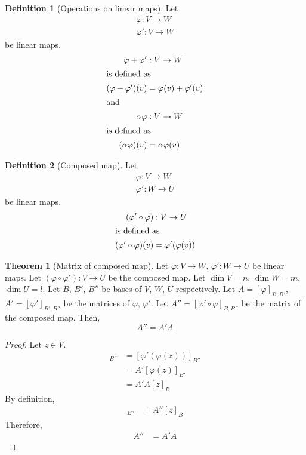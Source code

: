 \documentclass[fleqn, a4paper, 12pt, draft]{article}
\theoremstyle{definition}
\newtheorem{definition}{Definition} %
\theoremstyle{theorem}
\newtheorem{theorem}{Theorem} %
\theoremstyle{remark}
\numberwithin{corollary}{theorem}
\numberwithin{equation}{theorem}
\begin{document}
\begin{definition}[Operations on linear maps]
	Let
	\begin{align*}
		\varphi : V \to W\\
		\varphi' : V \to W
	\end{align*}
	be linear maps.
	\begin{align*}
		\varphi + \varphi' &: V \to W\\
		\intertext{is defined as}
		(\varphi + \varphi')(v) &= \varphi(v) + \varphi'(v)\\
		\intertext{and}
		\alpha \varphi &: V \to W\\
		\intertext{is defined as}
		(\alpha \varphi)(v) &= \alpha \varphi(v)
	\end{align*}
\end{definition}

\begin{definition}[Composed map]
	Let
	\begin{align*}
		\varphi : V \to W\\
		\varphi' : W \to U
	\end{align*}
	be linear maps.
	\begin{align*}
	(\varphi' \circ \varphi) &: V \to U\\
	\intertext{is defined as}
	(\varphi' \circ \varphi)(v) &= \varphi'(\varphi(v))
	\end{align*}
\end{definition}

\begin{theorem}[Matrix of composed map]
	Let $\varphi : V \to W$, $\varphi' : W \to U$ be linear maps. Let $(\varphi \circ \varphi') : V \to U$ be the composed map. Let $\dim V = n$, $\dim W = m$, $\dim U = l$. Let $B$, $B'$, $B''$ be bases of $V$, $W$, $U$ respectively. Let $A = [\varphi]_{B, B'}$, $A' = [\varphi']_{B', B''}$ be the matrices of $\varphi$, $\varphi'$. Let $A'' = [\varphi' \circ \varphi]_{B, B''}$ be the matrix of the composed map. Then, 
	\begin{equation*}
		A'' = A' A
	\end{equation*}
\end{theorem}

\begin{proof}
	Let $z \in V$.
	\begin{align*}
		[(\varphi' \circ \varphi)(z)]_{B''} &= [\varphi' (\varphi (z))]_{B''}\\
		&= A' [\varphi (z)]_{B'}\\
		&= A' A [z]_B
	\end{align*}
	By definition,
	\begin{align*}
		[(\varphi' \circ \varphi) (z)]_{B''} &= A'' [z]_B
	\end{align*}
	Therefore,
	\begin{align*}
		A'' &= A' A
	\end{align*}
\end{proof}
\end{document}
